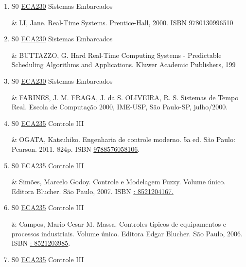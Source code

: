 \documentclass[12pt,a4paper]{book}
\begin{document}
\begin{enumerate}
&  HERMAN,  Kopetz;  “Real-Time  Systems: design principles for distributed embedded applications;  Kluwer Academic Publishers, 1997.  ISBN \href{http://www.isbnsearch.org/isbn/9780792398943}{9780792398943}
 

 \item S0 \hyperref[PUD:ECA230]{ECA230} Sistemas Embarcados

&  LI, Jane.  Real-Time Systems.  Prentice-Hall, 2000.  ISBN \href{http://www.isbnsearch.org/isbn/9780130996510}{9780130996510}
 

 \item S0 \hyperref[PUD:ECA230]{ECA230} Sistemas Embarcados

&  BUTTAZZO, G.  Hard Real-Time Computing Systems - Predictable Scheduling Algorithms and Applications.  Kluwer Academic Publishers, 199
 

 \item S0 \hyperref[PUD:ECA230]{ECA230} Sistemas Embarcados

&  FARINES, J. M.  FRAGA, J.  da S.  OLIVEIRA, R.  S.  Sistemas de Tempo Real.  Escola de Computação 2000, IME-USP, São Paulo-SP, julho/2000.
 \item S0 \hyperref[PUD:ECA235]{ECA235} Controle III

&  OGATA, Katsuhiko.  Engenharia de controle moderno.  5a ed.  São Paulo: Pearson.  2011.  824p.  ISBN \href{http://www.bn.br/site/pages/servicosProfissionais/agenciaISBN/isbnBusca/FbnBuscaISBNCatalogo.asp?pField=ISBN&pIntPagina=1&pISBN=76058106&nidbISBN=true&hidbISBN=true}{9788576058106}. 

 

 \item S0 \hyperref[PUD:ECA235]{ECA235} Controle III

&  Simões, Marcelo Godoy.  Controle e Modelagem Fuzzy.  Volume único.  Editora Blucher.  São Paulo, 2007.  ISBN \href{http://www.google.com/search?hl=pt-BR&tbo=p&tbm=bks&q=isbn:: 8521204167.&num=10}{: 8521204167.} 

 

 \item S0 \hyperref[PUD:ECA235]{ECA235} Controle III

&  Campos, Mario Cesar M.  Massa.  Controles típicos de equipamentos e processos industriais.  Volume único.  Editora Edgar Blucher.  São Paulo, 2006.  ISBN \href{http://www.google.com/search?hl=pt-BR&tbo=p&tbm=bks&q=isbn:: 
8521203985&num=10}{: 
8521203985}.
 \item S0 \hyperref[PUD:ECA235]{ECA235} Controle III


\end{enumerate}
\end{document}
